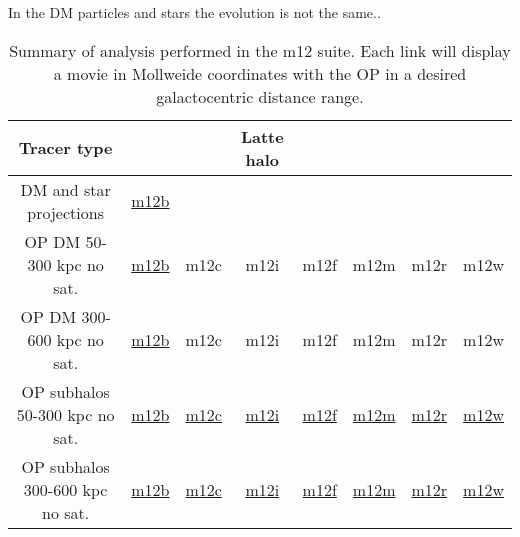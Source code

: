 \documentclass{aastex63}
\begin{document}
In the DM particles and stars the evolution is not the same..





\begin{table*}[h]
    \centering
    \begin{tabular}{c c c c c c c c }
        \hline
         Tracer type  &  & &  Latte halo  \\
         \hline 
         \hline
         DM and star projections &  \href{https://users.flatironinstitute.org/~nico/m12b_DM_stars_projections.gif}{m12b} \\
         OP DM 50-300 kpc no sat.  & \href{https://users.flatironinstitute.org/~nico/m12b_OP_DM_300_600.gif}{m12b}
 & m12c & m12i & m12f & m12m & m12r &  m12w \\
        OP DM 300-600 kpc no sat.  & \href{https://users.flatironinstitute.org/~nico/m12b_OP_faceon.gif}{m12b}
         & m12c & m12i & m12f & m12m & m12r & m12w\\
         OP subhalos 50-300 kpc no sat.  & \href{https://users.flatironinstitute.org/~nico/m12b_OP_subhalos_50_300.gif}{m12b}
         & \href{https://users.flatironinstitute.org/~nico/m12c_OP_subhalos_50_300.gif}{m12c}& 
         \href{https://users.flatironinstitute.org/~nico/m12i_OP_subhalos_50_300.gif}{m12i} & 
         \href{https://users.flatironinstitute.org/~nico/m12f_OP_subhalos_50_300.gif}{m12f} & 
         \href{https://users.flatironinstitute.org/~nico/m12m_subhalos_OP_mollweide_50_300.gif}{m12m} &
         \href{https://users.flatironinstitute.org/~nico/m12r_subhalo_OP_mollweide_50_300.gif}{m12r} &

         \href{https://users.flatironinstitute.org/~nico/m12w_OP_subhalos_50_300.gif}{m12w}\\
         OP subhalos 300-600 kpc no sat.  & \href{https://users.flatironinstitute.org/~nico/m12b_OP_subhalos_300_600.gif}{m12b}
         & \href{https://users.flatironinstitute.org/~nico/m12c_OP_subhalos_300_600.gif}{m12c} & 
          \href{https://users.flatironinstitute.org/~nico/m12i_OP_subhalos_300_600.gif}{m12i} & 
         \href{https://users.flatironinstitute.org/~nico/m12f_OP_subhalos_300_600.gif}{m12f} &
          \href{https://users.flatironinstitute.org/~nico/m12m_subhalos_OP_mollweide_300_600.gif}{m12m} &
          \href{https://users.flatironinstitute.org/~nico/m12f_OP_subhalos_300_600.gif}{m12r} & 
         \href{https://users.flatironinstitute.org/~nico/m12w_OP_subhalos_300_600.gif}{m12w}\\
         \hline
        \end{tabular}
    \caption{Summary of analysis performed in the m12 suite. Each link will display a movie in Mollweide coordinates with the OP in a desired galactocentric distance range.}
    \label{tab:op_mollweide_movies}
\end{table*}
\end{document}
